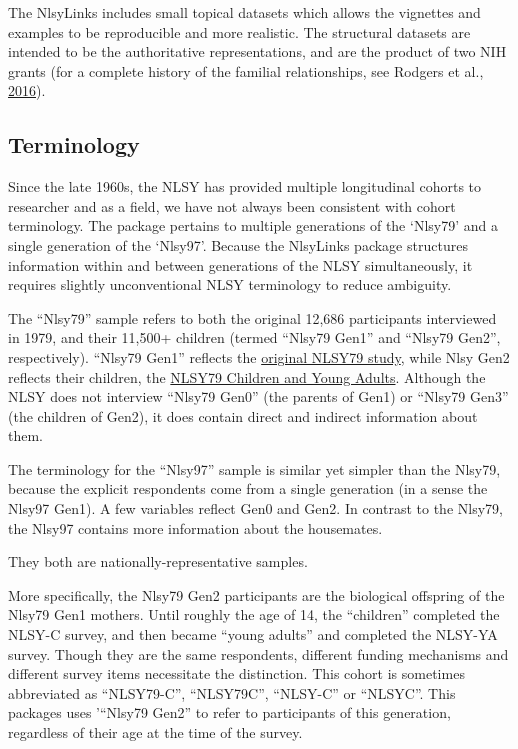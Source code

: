 \documentclass[smallextended]{svjour3}       %
\begin{document}
The NlsyLinks includes small topical datasets which allows the vignettes
and examples to be reproducible and more realistic. The structural
datasets are intended to be the authoritative representations, and are
the product of two NIH grants (for a complete history of the familial
relationships, see Rodgers et al.,
\href{https://link.springer.com/article/10.1007\%2Fs10519-016-9785-3}{2016}).

\hypertarget{terminology}{%
\subsection{Terminology}\label{terminology}}

Since the late 1960s, the NLSY has provided multiple longitudinal
cohorts to researcher and as a field, we have not always been consistent
with cohort terminology. The package pertains to multiple generations of
the `Nlsy79' and a single generation of the `Nlsy97'. Because the
NlsyLinks package structures information within and between generations
of the NLSY simultaneously, it requires slightly unconventional NLSY
terminology to reduce ambiguity.

The ``Nlsy79'' sample refers to both the original 12,686 participants
interviewed in 1979, and their 11,500+ children (termed ``Nlsy79 Gen1''
and ``Nlsy79 Gen2'', respectively). ``Nlsy79 Gen1'' reflects the
\href{https://www.nlsinfo.org/content/cohorts/nlsy79}{original NLSY79
study}, while Nlsy Gen2 reflects their children, the
\href{https://www.nlsinfo.org/content/cohorts/nlsy79-children}{NLSY79
Children and Young Adults}. Although the NLSY does not interview
``Nlsy79 Gen0'' (the parents of Gen1) or ``Nlsy79 Gen3'' (the children
of Gen2), it does contain direct and indirect information about them.

The terminology for the ``Nlsy97'' sample is similar yet simpler than
the Nlsy79, because the explicit respondents come from a single
generation (in a sense the Nlsy97 Gen1). A few variables reflect Gen0
and Gen2. In contrast to the Nlsy79, the Nlsy97 contains more
information about the housemates.

They both are nationally-representative samples.

More specifically, the Nlsy79 Gen2 participants are the biological
offspring of the Nlsy79 Gen1 mothers. Until roughly the age of 14, the
``children'' completed the NLSY-C survey, and then became ``young
adults'' and completed the NLSY-YA survey. Though they are the same
respondents, different funding mechanisms and different survey items
necessitate the distinction. This cohort is sometimes abbreviated as
``NLSY79-C'', ``NLSY79C'', ``NLSY-C'' or ``NLSYC''. This packages uses
'``Nlsy79 Gen2'' to refer to participants of this generation, regardless
of their age at the time of the survey.
\end{document}

